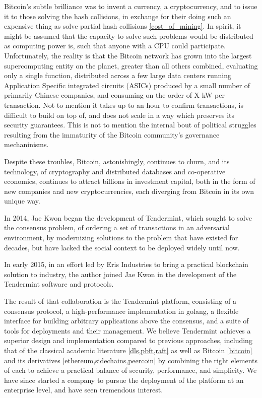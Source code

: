 Bitcoin's subtle brilliance was to invent a currency, a cryptocurrency, and to issue it to those solving the hash collisions, 
in exchange for their doing such an expensive thing as solve partial hash collisions \ref{cost_of_mining}.
In spirit, it might be assumed that the capacity to solve such problems would be distributed as computing power is, 
such that anyone with a CPU could participate.
Unfortunately, the reality is that the Bitcoin network has grown into the largest supercomputing entity on the planet, greater than all others combined,
evaluating only a single function, distributed across a few large data centers running Application Specific integrated circuits (ASICs) produced by a small number of primarily Chinese companies, and consuming on the order of X kW per transaction.
Not to mention it takes up to an hour to confirm transactions, is difficult to build on top of, and does not scale in a way which preserves its security guarantees.
This is not to mention the internal bout of political struggles resulting from the immaturity of the Bitcoin community's governance mechaninisms.

Despite these troubles, Bitcoin, astonishingly, continues to churn,
and its technology, 
of cryptography and distributed databases and co-operative economics,
continues to attract billions in investment capital,
both in the form of new companies and new cryptocurrencies,
each diverging from Bitcoin in its own unique way.

In 2014, Jae Kwon began the development of Tendermint, which sought to solve the consensus problem,
of ordering a set of transactions in an adversarial environment, 
by modernizing solutions to the problem that have existed for decades,
but have lacked the social context to be deployed widely until now.

In early 2015, in an effort led by Eris Industries to bring a practical blockchain solution to industry,
the author joined Jae Kwon in the development of the Tendermint software and protocols.

The result of that collaboration is the Tendermint platform, consisting of a consensus protocol, a high-performance implementation in golang, 
a flexible interface for building arbitrary applications above the consensus, and a suite of tools for deployments and their management.
We believe Tendermint achieves a superior design and implementation compared to previous approaches, 
including that of the classical academic literature \ref{dls,pbft,raft} as well as Bitcoin \ref{bitcoin} and its derivatives \ref{ethereum,sidechains,peercoin}
by combining the right elements of each to achieve a practical balance of security, performance, and simplicity.
We have since started a company to pursue the deployment of the platform at an enterprise level, and have seen tremendous interest.

